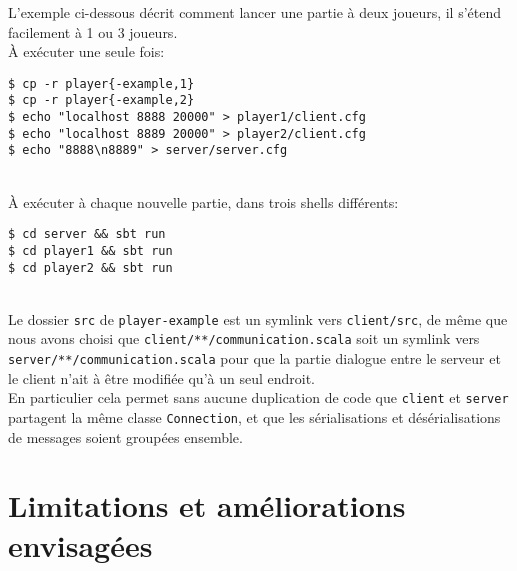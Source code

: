 \documentclass[a4paper,french]{article}
\newcommand{\ttt}[1]{\texttt{#1}}
\begin{document}
L'exemple ci-dessous d\'ecrit comment lancer une partie \`a deux joueurs, il s'\'etend facilement \`a 1 ou 3 joueurs.\\

\`A ex\'ecuter une seule fois:
\begin{lstlisting}
$ cp -r player{-example,1}
$ cp -r player{-example,2}
$ echo "localhost 8888 20000" > player1/client.cfg
$ echo "localhost 8889 20000" > player2/client.cfg
$ echo "8888\n8889" > server/server.cfg
\end{lstlisting}~\\


\`A ex\'ecuter \`a chaque nouvelle partie, dans trois shells diff\'erents:
\begin{lstlisting}
$ cd server && sbt run
$ cd player1 && sbt run
$ cd player2 && sbt run
\end{lstlisting}~\\

Le dossier \ttt{src} de \ttt{player-example} est un symlink vers \ttt{client/src}, de m\^eme que nous avons choisi
que \ttt{client/**/communication.scala} soit un symlink vers \ttt{server/**/communication.scala} pour que la partie
dialogue entre le serveur et le client n'ait \`a \^etre modifi\'ee qu'\`a un seul endroit.\\
En particulier cela permet sans aucune duplication de code que \ttt{client} et \ttt{server} partagent la m\^eme classe
\ttt{Connection}, et que les s\'erialisations et d\'es\'erialisations de messages soient group\'ees ensemble.


\section{Limitations et am\'eliorations envisag\'ees}
\end{document}
